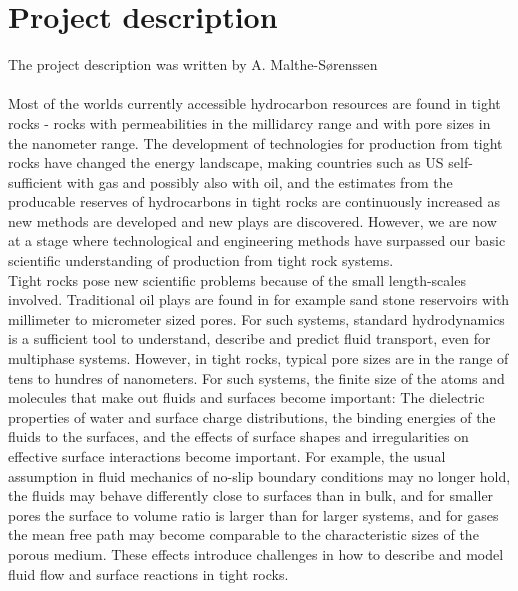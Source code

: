 \section{Project description}
The project description was written by A. Malthe-S{\o}renssen\\
\\
Most of the worlds currently accessible hydrocarbon resources are found in tight rocks - rocks with permeabilities in the millidarcy range and with pore sizes in the nanometer range. The development of technologies for production from tight rocks have changed the energy landscape, making countries such as US self-sufficient with gas and possibly also with oil, and the estimates from the producable reserves of hydrocarbons in tight rocks are continuously increased as new methods are developed and new plays are discovered. However, we are now at a stage where technological and engineering methods have surpassed our basic scientific understanding of production from tight rock systems.\\
Tight rocks pose new scientific problems because of the small length-scales involved. Traditional oil plays are found in for example sand stone reservoirs with millimeter to micrometer sized pores. For such systems, standard hydrodynamics is a sufficient tool to understand, describe and predict fluid transport, even for multiphase systems. However, in tight rocks, typical pore sizes are in the range of tens to hundres of nanometers. For such systems, the finite size of the atoms and molecules that make out fluids and surfaces become important: The dielectric properties of water and surface charge distributions, the binding energies of the fluids to the surfaces, and the effects of surface shapes and irregularities on effective surface interactions become important. For example, the usual assumption in fluid mechanics of no-slip boundary conditions may no longer hold, the fluids may behave differently close to surfaces than in bulk, and for smaller pores the surface to volume ratio is larger than for larger systems, and for gases the mean free path may become comparable to the characteristic sizes of the porous medium. These effects introduce challenges in how to describe and model fluid flow and surface reactions in tight rocks.\\
